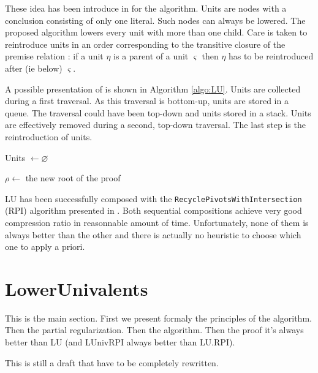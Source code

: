 \documentclass{llncs}
\begin{document}
These idea has been introduce in \cite{LURPI} for the {\LowerUnits} algorithm. Units are nodes with a
conclusion consisting of only one literal. Such nodes can always be lowered. The proposed algorithm
lowers every unit with more than one child. Care is taken to reintroduce units in an order
corresponding to the transitive closure of the premise relation : if a unit $\eta$ is a parent of a
unit $\varsigma$ then $\eta$ has to be reintroduced after (ie below) $\varsigma$.

A possible presentation of {\LowerUnits} is shown in Algorithm \ref{algo:LU}. Units are collected during a
first traversal. As this traversal is bottom-up, units are stored in a queue. The traversal could
have been top-down and units stored in a stack. Units are effectively removed during a second,
top-down traversal. The last step is the reintroduction of units.

\begin{algorithm}[bt]
  Units $\leftarrow \varnothing$ \;



  $\rho \leftarrow$ the new root of the proof \;

  \label{algo:LU}
  \caption{\LowerUnits}
\end{algorithm}

LU has been successfully composed with the \texttt{RecyclePivotsWithIntersection} (RPI) algorithm
presented in \cite{LURPI}. Both sequential compositions achieve very good compression ratio in
reasonnable amount of time. Unfortunately, none of them is always better than the other and there is
actually no heuristic to choose which one to apply a priori.

\section{LowerUnivalents}

\begin{jb}
This is the main section. First we present formaly the principles of the algorithm. Then the partial
regularization. Then the algorithm. Then the proof it's always better than LU (and LUnivRPI always
better than LU.RPI).

This is still a draft that have to be completely rewritten.
\end{jb}
\end{document}
